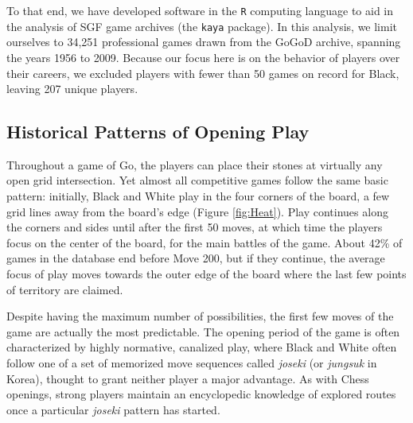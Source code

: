 To that end, we have developed software in the \texttt{R} computing language to aid in the analysis of SGF game archives (the \texttt{kaya} package).  In this analysis, we limit ourselves to 34,251 professional games drawn from the GoGoD archive, spanning the years 1956 to 2009.  Because our focus here is on the behavior of players over their careers, we excluded players with fewer than 50 games on record for Black, leaving 207 unique players.

\subsection{Historical Patterns of Opening Play}

Throughout a game of Go, the players can place their stones at virtually any open grid intersection.  Yet almost all competitive games follow the same basic pattern: initially, Black and White play in the four corners of the board, a few grid lines away from the board's edge (Figure \ref{fig:Heat}).  Play continues along the corners and sides until after the first 50 moves, at which time the players focus on the center of the board, for the main battles of the game.  About 42\% of games in the database end before Move 200, but if they continue, the average focus of play moves towards the outer edge of the board where the last few points of territory are claimed.  

Despite having the maximum number of possibilities, the first few moves of the game are actually the most predictable.  The opening period of the game is often characterized by highly normative, canalized play, where Black and White often follow one of a set of memorized move sequences called \textit{joseki} (or \textit{jungsuk} in Korea), thought to grant neither player a major advantage.  As with Chess openings, strong players maintain an encyclopedic knowledge of explored routes once a particular \textit{joseki} pattern has started.  


